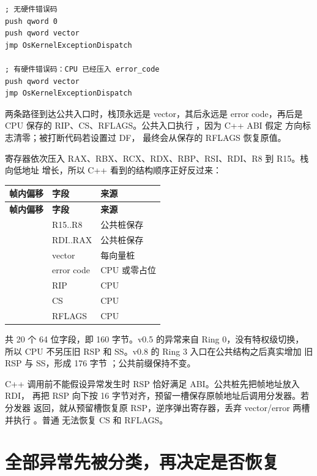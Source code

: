 \begin{lstlisting}[language={[x86masm]Assembler}]
; 无硬件错误码
push qword 0
push qword vector
jmp OsKernelExceptionDispatch

; 有硬件错误码：CPU 已经压入 error_code
push qword vector
jmp OsKernelExceptionDispatch
\end{lstlisting}

两条路径到达公共入口时，栈顶永远是 vector，其后永远是 error code，再后是
CPU 保存的 RIP、CS、RFLAGS。公共入口执行 ，因为 C++ ABI 假定
方向标志清零；被打断代码若设置过 DF， 最终会从保存的 RFLAGS
恢复原值。

寄存器依次压入 RAX、RBX、RCX、RDX、RBP、RSI、RDI、R8 到 R15。栈向低地址
增长，所以 C++ 看到的结构顺序正好反过来：

\begin{longtable}{L{0.16\textwidth}L{0.23\textwidth}L{0.47\textwidth}}
\toprule
\textbf{帧内偏移} & \textbf{字段} & \textbf{来源}\\
\midrule
\endfirsthead
\toprule
\textbf{帧内偏移} & \textbf{字段} & \textbf{来源}\\
\midrule
\endhead
{} & R15..R8 & 公共桩保存\\
 & RDI..RAX & 公共桩保存\\
 & vector & 每向量桩\\
 & error code & CPU 或零占位\\
 & RIP & CPU\\
 & CS & CPU\\
 & RFLAGS & CPU\\
\bottomrule
\end{longtable}

共 20 个 64 位字段，即 160 字节。v0.5 的异常来自 Ring 0，没有特权级切换，
所以 CPU 不另压旧 RSP 和 SS。v0.8 的 Ring 3 入口在公共结构之后真实增加
旧 RSP 与 SS，形成 176 字节 ；公共前缀保持不变。

C++ 调用前不能假设异常发生时 RSP 恰好满足 ABI。公共桩先把帧地址放入 RDI，
再把 RSP 向下按 16 字节对齐，预留一槽保存原帧地址后调用分发器。若分发器
返回，就从预留槽恢复原 RSP，逆序弹出寄存器，丢弃 vector/error 两槽并执行
。普通  无法恢复 CS 和 RFLAGS。

\section{全部异常先被分类，再决定是否恢复}

